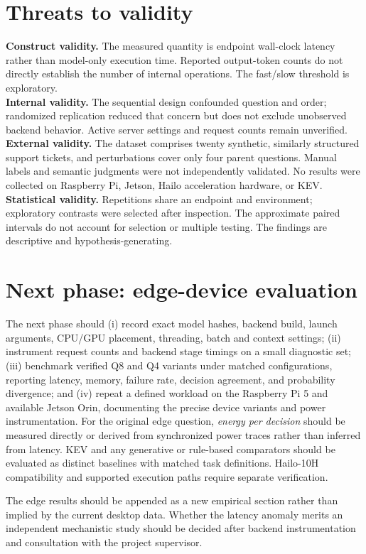 \documentclass[10pt,twocolumn]{article}
\begin{document}
\section{Threats to validity}
\textbf{Construct validity.} The measured quantity is endpoint wall-clock latency rather than model-only execution time. Reported output-token counts do not directly establish the number of internal operations. The fast/slow threshold is exploratory.\\
\textbf{Internal validity.} The sequential design confounded question and order; randomized replication reduced that concern but does not exclude unobserved backend behavior. Active server settings and request counts remain unverified.\\
\textbf{External validity.} The dataset comprises twenty synthetic, similarly structured support tickets, and perturbations cover only four parent questions. Manual labels and semantic judgments were not independently validated. No results were collected on Raspberry Pi, Jetson, Hailo acceleration hardware, or KEV.\\
\textbf{Statistical validity.} Repetitions share an endpoint and environment; exploratory contrasts were selected after inspection. The approximate paired intervals do not account for selection or multiple testing. The findings are descriptive and hypothesis-generating.

\section{Next phase: edge-device evaluation}
The next phase should (i) record exact model hashes, backend build, launch arguments, CPU/GPU placement, threading, batch and context settings; (ii) instrument request counts and backend stage timings on a small diagnostic set; (iii) benchmark verified Q8 and Q4 variants under matched configurations, reporting latency, memory, failure rate, decision agreement, and probability divergence; and (iv) repeat a defined workload on the Raspberry Pi 5 and available Jetson Orin, documenting the precise device variants and power instrumentation. For the original edge question, \emph{energy per decision} should be measured directly or derived from synchronized power traces rather than inferred from latency. KEV and any generative or rule-based comparators should be evaluated as distinct baselines with matched task definitions. Hailo-10H compatibility and supported execution paths require separate verification.

The edge results should be appended as a new empirical section rather than implied by the current desktop data. Whether the latency anomaly merits an independent mechanistic study should be decided after backend instrumentation and consultation with the project supervisor.
\end{document}
